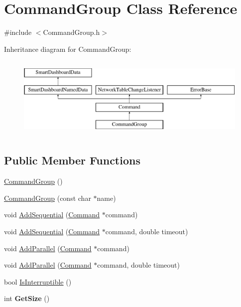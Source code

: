 \hypertarget{classCommandGroup}{
\section{CommandGroup Class Reference}
\label{classCommandGroup}
}


{\ttfamily \#include $<$CommandGroup.h$>$}

Inheritance diagram for CommandGroup:\begin{figure}[H]
\begin{center}
\leavevmode
\includegraphics[height=4.000000cm]{classCommandGroup}
\end{center}
\end{figure}
\subsection*{Public Member Functions}
\begin{DoxyCompactItemize}
\item 
\hyperlink{classCommandGroup_a862143e691209986739c234cb0fc4cc8}{CommandGroup} ()
\item 
\hyperlink{classCommandGroup_a050293db5f70536289063006684d9d48}{CommandGroup} (const char $\ast$name)
\item 
void \hyperlink{classCommandGroup_a37206a473a9a01ba8098d73f452de71b}{AddSequential} (\hyperlink{classCommand}{Command} $\ast$command)
\item 
void \hyperlink{classCommandGroup_ab4995b5b0bb694f79bcef0b84c893b80}{AddSequential} (\hyperlink{classCommand}{Command} $\ast$command, double timeout)
\item 
void \hyperlink{classCommandGroup_a3c7e096849f7586389769454b3148be3}{AddParallel} (\hyperlink{classCommand}{Command} $\ast$command)
\item 
void \hyperlink{classCommandGroup_a843c4cc19eeb1d55615c017dac511c82}{AddParallel} (\hyperlink{classCommand}{Command} $\ast$command, double timeout)
\item 
bool \hyperlink{classCommandGroup_ab02206bb10bc9ef6784ec08037580b75}{IsInterruptible} ()
\item 
\hypertarget{classCommandGroup_a8d10c609973d9de158ae46d9374cef56}{
int {\bfseries GetSize} ()}
\label{classCommandGroup_a8d10c609973d9de158ae46d9374cef56}

\end{DoxyCompactItemize}
